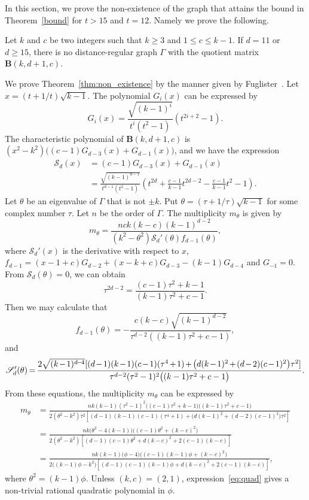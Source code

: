 \documentclass[ALCO,ThmDefs,Unicode,epreuves]{cedram}
\newcommand*{\Mk}{\mkern -2mu}
\begin{document}
In this section, we prove the non-existence of the graph that attains the bound in Theorem~\ref{bound} for $t>15$ and $t=12$.
Namely we prove the following. 
\begin{theo} \label{thm:non_existence}
Let $k$ and $c$ be two integers such that $k\geq 3$ and $1\leq c\leq k-1$. If $d=11$ or $d\geq 15$, there is no distance-regular graph $\Gamma$ with the quotient matrix $\boldsymbol{B} (k,d+1,c)$. 
\end{theo}
We prove Theorem~\ref{thm:non_existence} by the manner given by Fuglister~\cite{F87}.
Let $x=(t+1/t)\sqrt{k-1}$. The polynomial $G_i(x)$ can be expressed by 
\[
G_i(x)=\frac{\sqrt{(k-1)^i}}{t^i(t^2-1)}(t^{2i+2}-1). 
\]
The characteristic polynomial of $\boldsymbol{B}(k,d+1,c)$ is
$(x^2-k^2)\big( (c-1)G_{d-3}(x)+G_{d-1}(x) \big)$, and we have the expression 
\begin{align*}
\mathscr{S}_{d}(x)&=(c-1)G_{d-3}(x)+G_{d-1}(x)\\
&=\frac{\sqrt{(k-1)^{d-1}}}{t^{d-1}(t^2-1)}\left( 
t^{2d}+\frac{c-1}{k-1}t^{2d-2}- \frac{c-1}{k-1}t^2-1 \right).
\end{align*}
Let $\theta$ be an eigenvalue of $\Gamma$ that is not $\pm k$. Put $\theta=(\tau+1/\tau) \sqrt{k-1}$ for some complex number $\tau$. 
 Let $n$ be the order of $\Gamma$. The multiplicity $m_\theta$ is given by 
\[
m_\theta=\frac{nck(k-c)(k-1)^{d-2}}
{(k^2-\theta^2) \mathscr{S}_{d}'(\theta) f_{d-1}(\theta)},
\]
where $\mathscr{S}_{d}'(x)$ is the derivative with respect to $x$, $f_{d-1}=(x-1+c)G_{d-2}+(x-k+c)G_{d-3}-
(k-1)G_{d-4}$ and $G_{-1}=0$. 
From $\mathscr{S}_{d}(\theta)=0$, we can obtain 
\[
\tau^{2d-2}=\frac{(c-1) \tau^2+k-1}{(k-1)\tau^2+c-1}.
\]
Then we may calculate that
\[
f_{d-1}(\theta)= -\frac{c(k-c)\sqrt{(k-1)^{d-2}}}
{\tau^{d-2}((k-1)\tau^2+c-1)},
\]
and 
\[
\mathscr{S}_{d}'(\theta)\Mk =\Mk 
\frac{2 \sqrt{(k\Mk -\Mk 1)^{d\Mk -\Mk 4}}[(d\Mk -\Mk 1)(k\Mk -\Mk 1)(c\Mk -\Mk 1)(\tau^4\Mk +\Mk 1)\Mk + \Mk 
\big(d(k\Mk -\Mk 1)^2\Mk +\Mk (d\Mk -\Mk 2)(c\Mk -\Mk 1)^2\big)\tau^2]}
{\tau^{d-2}(\tau^2-1)^2\big((k-1)\tau^2+c-1\big)}. 
\]
 From these equations, the multiplicity $m_\theta$ can be expressed by 
\begin{align}
m_\theta&= \frac{nk(k-1)(\tau^2-1)^2 
\big( (c-1)\tau^2 + k-1 \big) \big((k-1)\tau^2+c-1 \big)}
{2(\theta^2-k^2) \tau^2 [(d-1)(k-1)(c-1)(\tau^4+1)+
 \big(d(k-1)^2+(d-2)(c-1)^2 \big) \tau^2
]} \nonumber 
\\
&=\frac{nk\big(\theta^2-4(k-1)\big)\big((c-1)\theta^2+(k-c)^2 \big)}
{2(\theta^2-k^2)[(d-1)(c-1)\theta^2+d(k-c)^2+2(c-1)(k-c)]} 
\nonumber 
\\
&=\frac{nk(k-1)\big(\phi-4\big)\big((c-1)(k-1)\phi+(k-c)^2 \big)}
{2\big((k-1)\phi-k^2\big)[(d-1)(c-1)(k-1)\phi+d(k-c)^2+2(c-1)(k-c)]}, \label{eq:quad} 
\end{align}
where $\theta^2=(k-1)\phi$. Unless $(k,c)=(2,1)$, expression~\eqref{eq:quad} gives a non-trivial rational quadratic polynomial in $\phi$. 
\end{document}
